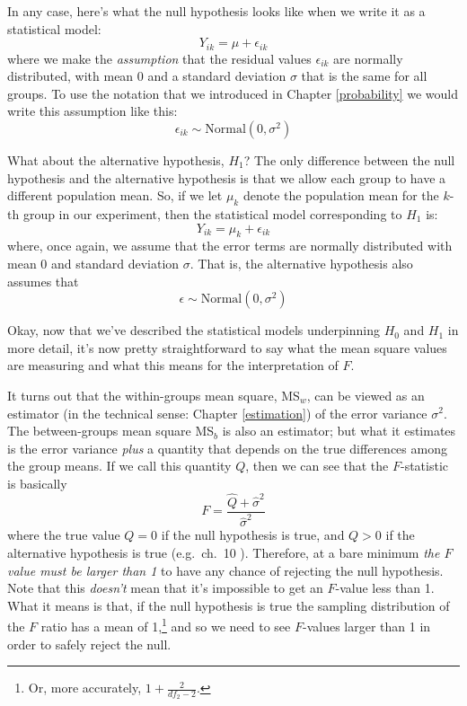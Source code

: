 \documentclass[
  11pt,
  a4paper,
  twoside,symmetric,openright]{book}
\theoremstyle{break}
\theoremstyle{break}
\begin{document}
In any case, here's what the null hypothesis looks like when we write it as a statistical model:
\[
Y_{ik} = \mu + \epsilon_{ik}
\]
where we make the \emph{assumption} that the residual values \(\epsilon_{ik}\) are normally distributed, with mean 0 and a standard deviation \(\sigma\) that is the same for all groups. To use the notation that we introduced in Chapter \ref{probability} we would write this assumption like this:
\[
\epsilon_{ik} \sim \mbox{Normal}(0, \sigma^2)
\]

What about the alternative hypothesis, \(H_1\)? The only difference between the null hypothesis and the alternative hypothesis is that we allow each group to have a different population mean. So, if we let \(\mu_k\) denote the population mean for the \(k\)-th group in our experiment, then the statistical model corresponding to \(H_1\) is:
\[
Y_{ik} = \mu_k + \epsilon_{ik}
\]
where, once again, we assume that the error terms are normally distributed with mean 0 and standard deviation \(\sigma\). That is, the alternative hypothesis also assumes that
\[
\epsilon \sim \mbox{Normal}(0, \sigma^2)
\]

Okay, now that we've described the statistical models underpinning \(H_0\) and \(H_1\) in more detail, it's now pretty straightforward to say what the mean square values are measuring and what this means for the interpretation of \(F\).

It turns out that the within-groups mean square, MS\(_w\), can be viewed as an estimator (in the technical sense: Chapter \ref{estimation}) of the error variance \(\sigma^2\). The between-groups mean square MS\(_b\) is also an estimator; but what it estimates is the error variance \emph{plus} a quantity that depends on the true differences among the group means. If we call this quantity \(Q\), then we can see that the \(F\)-statistic is basically
\[
F = \frac{\hat{Q} + \hat\sigma^2}{\hat\sigma^2}
\]
where the true value \(Q=0\) if the null hypothesis is true, and \(Q > 0\) if the alternative hypothesis is true (e.g.~ch.~10 ). Therefore, at a bare minimum \emph{the \(F\) value must be larger than 1} to have any chance of rejecting the null hypothesis. Note that this \emph{doesn't} mean that it's impossible to get an \(F\)-value less than 1. What it means is that, if the null hypothesis is true the sampling distribution of the \(F\) ratio has a mean of 1,\footnote{Or, more accurately, \(1 + \frac{2}{df_2 - 2}\).} and so we need to see \(F\)-values larger than 1 in order to safely reject the null.
\end{document}

